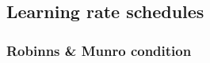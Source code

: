 \subsection{Learning rate schedules}

\begin{frame}\frametitle{Robinns \& Munro condition}

\begin{figure}[ht]
     \centering
     \begin{subfigure}[t]{0.35\textwidth}
         \centering
         \usebox{\imagebox}%
         \caption{}
     \end{subfigure}
     \hspace{10mm}
     \begin{subfigure}[t]{0.5\textwidth}
         \centering
         \caption{}
     \end{subfigure}
\end{figure}

    
\end{frame}


